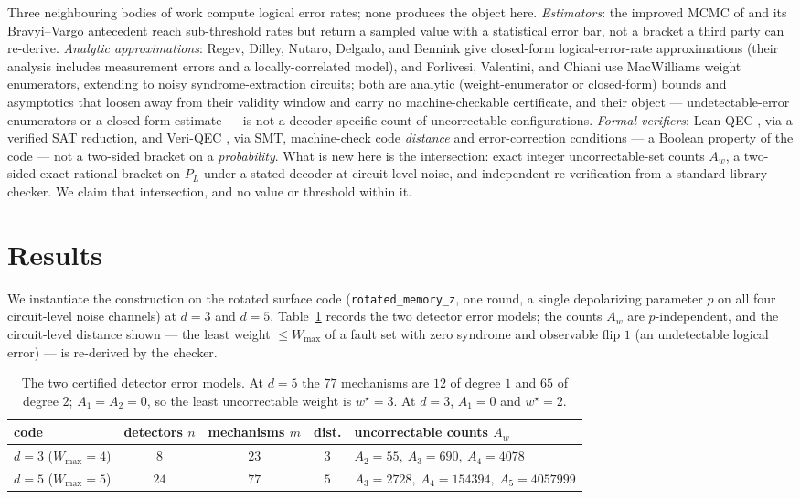 \documentclass[11pt]{amsart}
\newcommand{\PL}{P_{L}}
\newcommand{\WMAX}{W_{\max}}
\theoremstyle{plain}
\theoremstyle{definition}
\theoremstyle{remark}
\begin{document}
Three neighbouring bodies of work compute logical error rates; none produces
the object here. \emph{Estimators}: the improved MCMC of \cite{MWB} and its
Bravyi--Vargo antecedent \cite{BV} reach sub-threshold rates but return a
sampled value with a statistical error bar, not a bracket a third party can
re-derive. \emph{Analytic approximations}: Regev, Dilley, Nutaro, Delgado, and
Bennink \cite{Regev} give closed-form logical-error-rate approximations (their
analysis includes measurement errors and a locally-correlated model), and
Forlivesi, Valentini, and Chiani \cite{FVC} use MacWilliams weight enumerators,
extending to noisy syndrome-extraction circuits; both are analytic
(weight-enumerator or closed-form) bounds and asymptotics that loosen away from
their validity window and carry no machine-checkable certificate, and their
object --- undetectable-error enumerators or a closed-form estimate --- is not
a decoder-specific count of uncorrectable configurations. \emph{Formal
verifiers}: Lean-QEC \cite{LeanQEC}, via a verified SAT reduction, and Veri-QEC
\cite{VeriQEC}, via SMT, machine-check code \emph{distance} and error-correction
conditions --- a Boolean property of the code --- not a two-sided bracket on a
\emph{probability}. What is new here is the intersection: exact integer
uncorrectable-set counts $A_w$, a two-sided exact-rational bracket on $\PL$
under a stated decoder at circuit-level noise, and independent re-verification
from a standard-library checker. We claim that intersection, and no value or
threshold within it.

\section{Results}\label{sec:results}

We instantiate the construction on the rotated surface code
(\texttt{rotated\_memory\_z}, one round, a single depolarizing parameter $p$ on
all four circuit-level noise channels) at $d=3$ and $d=5$. Table~\ref{tab:dem}
records the two detector error models; the counts $A_w$ are $p$-independent, and
the circuit-level distance shown --- the least weight $\le\WMAX$ of a fault set
with zero syndrome and observable flip $1$ (an undetectable logical error) ---
is re-derived by the checker.

\begin{table}[ht]
\begin{center}
\begin{tabular}{lcccl}
\toprule
code & detectors $n$ & mechanisms $m$ & dist. & uncorrectable counts $A_w$ \\
\midrule
$d=3$ ($\WMAX=4$) & $8$ & $23$ & $3$ &
   $A_2{=}55,\ A_3{=}690,\ A_4{=}4078$ \\
$d=5$ ($\WMAX=5$) & $24$ & $77$ & $5$ &
   $A_3{=}2728,\ A_4{=}154394,\ A_5{=}4057999$ \\
\bottomrule
\end{tabular}
\end{center}
\caption{The two certified detector error models. At $d=5$ the $77$ mechanisms
are $12$ of degree $1$ and $65$ of degree $2$; $A_1=A_2=0$, so the least
uncorrectable weight is $w^\star=3$. At $d=3$, $A_1=0$ and $w^\star=2$.}
\label{tab:dem}
\end{table}
\end{document}

